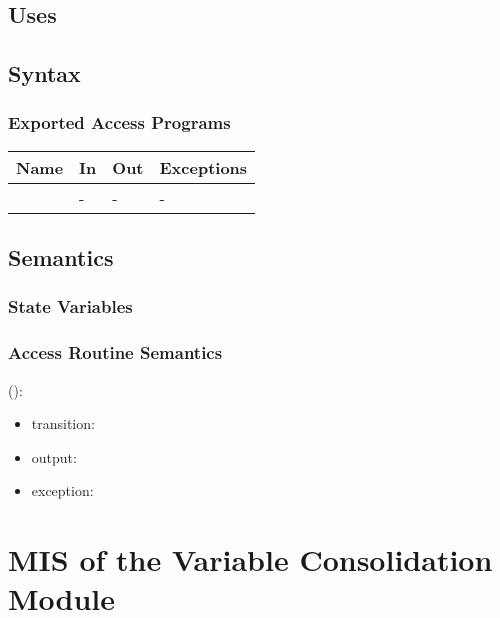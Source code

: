 \documentclass[12pt, titlepage]{article}
\begin{document}

\subsection{Uses}


\subsection{Syntax}

\subsubsection{Exported Access Programs}

\begin{center}
	\begin{tabular}{p{3cm} p{4cm} p{4cm} p{2cm}}
		\hline
		\textbf{Name} & \textbf{In} & \textbf{Out} & \textbf{Exceptions} \\
		\hline
		\wss{accessProg} & - & - & - \\
		\hline
	\end{tabular}
\end{center}

\subsection{Semantics}

\subsubsection{State Variables}


\subsubsection{Access Routine Semantics}

\noindent {}():
\begin{itemize}
	\item transition:  
	\item output:  
	\item exception:  
\end{itemize}

\newpage

\section{MIS of the Variable Consolidation Module} 
\label{Module_variableconsolidation}
\end{document}
